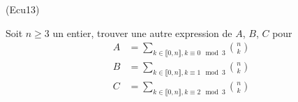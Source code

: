 \begin{tiny}(Ecu13)\end{tiny}
Soit $n\geq 3$ un entier, trouver une autre expression de $A$, $B$, $C$ pour
\begin{align*}
 A &= \sum_{
k\in\llbracket 0, n \rrbracket, k\equiv 0 \mod 3 
} \binom{n}{k} \\
 B &= \sum_{k\in\llbracket 0, n \rrbracket, k\equiv 1 \mod 3}  \binom{n}{k} \\
 C &= \sum_{k\in\llbracket 0, n \rrbracket, k\equiv 2 \mod 3}  \binom{n}{k} 
\end{align*}

